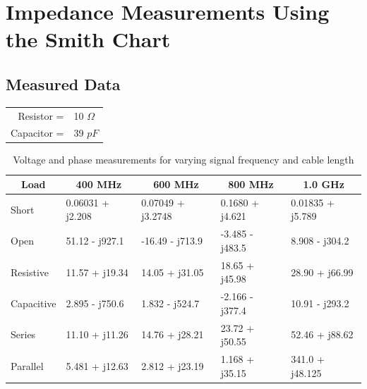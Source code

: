 \documentclass{article}
\begin{document}
\section{Impedance Measurements Using the Smith Chart}

\subsection{Measured Data}
\begin{table}[H]
\centering
	\begin{tabular}{rl}
	Resistor =   & 10 $\Omega$  \\
	Capacitor =  & 39 $pF$      
	\end{tabular}
\end{table}

\begin{table}[H]
\centering
\begin{tabular}{|l|l|l|l|l|}
\hline
\multicolumn{1}{|c|}{\textbf{Load}} & \multicolumn{1}{c|}{\textbf{400 MHz}} & \multicolumn{1}{c|}{\textbf{600 MHz}} & \multicolumn{1}{c|}{\textbf{800 MHz}} & \multicolumn{1}{c|}{\textbf{1.0 GHz}} \\ \hline
Short                               & 0.06031 + j2.208                      & 0.07049 + j3.2748                     & 0.1680 + j4.621                       & 0.01835 + j5.789                      \\ \hline
Open                                & 51.12 - j927.1                        & -16.49 - j713.9                       & -3.485 - j483.5                       & 8.908 - j304.2                        \\ \hline
Resistive                           & 11.57 + j19.34                        & 14.05 + j31.05                        & 18.65 + j45.98                        & 28.90 + j66.99                        \\ \hline
Capacitive                          & 2.895 - j750.6                        & 1.832 - j524.7                        & -2.166 - j377.4                       & 10.91 - j293.2                        \\ \hline
Series                              & 11.10 + j11.26                        & 14.76 + j28.21                        & 23.72 + j50.55                        & 52.46 + j88.62                        \\ \hline
Parallel                            & 5.481 + j12.63                        & 2.812 + j23.19                        & 1.168 + j35.15                        & 341.0 + j48.125
\\ \hline
\end{tabular}
	\caption{Voltage and phase measurements for varying signal frequency and cable length}
	\label{Data 1}
\end{table}
\end{document}
